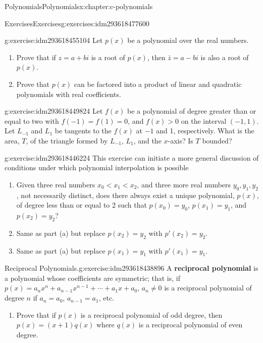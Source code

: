\documentclass[twoside,10pt,]{book}
\newcommand{\terminology}[1]{\textbf{#1}}
\numberwithin{equation}{section}
\newcommand{\lt}{<}
\begin{document}
\begin{chapterptx}{Polynomials}{}{Polynomials}{}{}{x:chapter:c-polynomials}
\begin{exercises-section}{Exercises}{}{Exercises}{}{}{g:exercises:idm293618477600}
\begin{divisionexercise}{4}{}{}{g:exercise:idm293618455104}
Let \(p(x)\) be a polynomial over the real numbers.%
\begin{enumerate}[label=(\alph*)]
\item{}Prove that if \(z=a + b i\) is a root of \(p(x)\), then \(\bar{z}= a -b i\) is also a root of \(p(x)\).%
\item{}Prove that \(p(x)\) can be factored into a product of linear and quadratic polynomials with real coefficients.%
\end{enumerate}
%
\end{divisionexercise}%
\begin{divisionexercise}{5}{}{}{g:exercise:idm293618449824}%
Let \(f(x)\) be a polynomial of degree greater than or equal to two with \(f(-1)=f(1)=0\), and \(f(x)>0\) on the interval \((-1,1)\).  Let \(L_{-1}\) and \(L_1\) be tangents to the \(f(x)\) at \(-1\) and 1, respectively. What is the area, \(T\), of the triangle formed by \(L_{-1}\), \(L_1\), and the \(x\)-axis?  Is \(T\) bounded?%
\end{divisionexercise}%
\begin{divisionexercise}{6}{}{}{g:exercise:idm293618446224}%
This exercise can initiate a more general discussion of conditions under which polynomial interpolation is possible%
\begin{enumerate}[label=(\alph*)]
\item{}Given three real numbers \(x_0 \lt x_1 \lt x_2\), and three more real numbers \(y_0, y_1, y_2\), not necessarily distinct, does there always exist a unique polynomial, \(p(x)\), of degree less than or equal to 2 such that \(p\left(x_0\right)=y_0\), \(p\left(x_1\right)=y_1\), and \(p\left(x_2\right)=y_2\)?%
\item{}Same as part (a) but replace \(p\left(x_2\right)=y_2\) with \(p'\left(x_2\right)=y_2\).%
\item{}Same as part (a) but replace \(p\left(x_1\right)=y_1\) with \(p'\left(x_1\right)=y_1\).%
\end{enumerate}
%
\end{divisionexercise}%
\begin{divisionexercise}{7}{Reciprocal Polynomials.}{}{g:exercise:idm293618438896}%
%
A \terminology{reciprocal polynomial} is a polynomial whose coefficients are symmetric; that is, if \(p(x) = a_n x^n + a_{n-1}x^{n-1}+ \cdots +a_1 x + a_0\), \(a_n \neq 0\) is a reciprocal polynomial of degree \(n\) if \(a_n = a_0\), \(a_{n-1} = a_1\), etc.%
\begin{enumerate}[label=(\alph*)]
\item{}Prove that if \(p(x)\) is a reciprocal polynomial of odd degree, then \(p(x) = (x+1)q(x)\) where \(q(x) \) is a reciprocal polynomial of even degree.%

\end{enumerate}
\end{divisionexercise}
\end{exercises-section}
\end{chapterptx}
\end{document}
